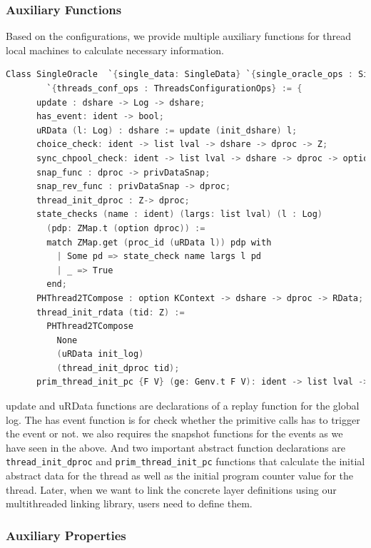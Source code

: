 \subsubsection{Auxiliary Functions}

Based on the configurations, we provide multiple auxiliary functions 
for thread local machines to calculate necessary information. 
\begin{lstlisting}[language=C]
  Class SingleOracle  `{single_data: SingleData} `{single_oracle_ops : SingleOracleOps}  
        `{threads_conf_ops : ThreadsConfigurationOps} := {
      update : dshare -> Log -> dshare;
      has_event: ident -> bool;      
      uRData (l: Log) : dshare := update (init_dshare) l;      
      choice_check: ident -> list lval -> dshare -> dproc -> Z;
      sync_chpool_check: ident -> list lval -> dshare -> dproc -> option SyncChanPool;
      snap_func : dproc -> privDataSnap;
      snap_rev_func : privDataSnap -> dproc; 
      thread_init_dproc : Z-> dproc;
      state_checks (name : ident) (largs: list lval) (l : Log) 
        (pdp: ZMap.t (option dproc)) :=
        match ZMap.get (proc_id (uRData l)) pdp with 
          | Some pd => state_check name largs l pd
          | _ => True
        end;
      PHThread2TCompose : option KContext -> dshare -> dproc -> RData;      
      thread_init_rdata (tid: Z) :=
        PHThread2TCompose
          None
          (uRData init_log)
          (thread_init_dproc tid);
      prim_thread_init_pc {F V} (ge: Genv.t F V): ident -> list lval -> option val }.
\end{lstlisting}
update and uRData functions are  declarations of a replay function for the global log. 
The has event function is for check whether the primitive calls has to trigger the event or not. 
we also requires the snapshot functions for the events as we have seen in the above.
And two important abstract function declarations 
are \lstinline$thread_init_dproc$ and \lstinline$prim_thread_init_pc$ functions 
that calculate the initial abstract data for the thread as well as the initial program counter value 
for the thread. 
Later, when we want to link the concrete layer definitions using our multithreaded linking library, users need to define them.

\subsubsection{Auxiliary Properties}


